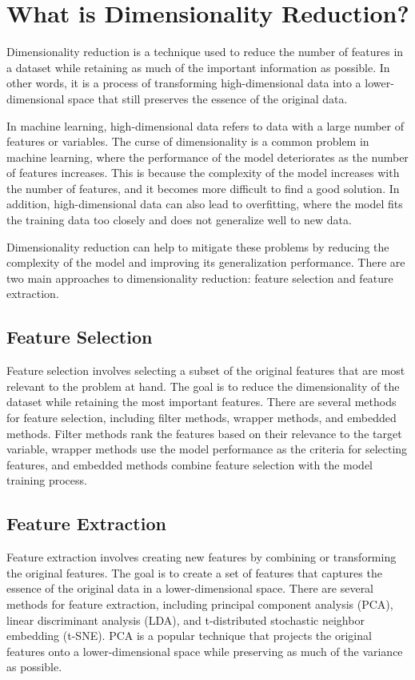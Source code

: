 \section{What is Dimensionality Reduction?}
    Dimensionality reduction is a technique used to reduce the number of features in a dataset while retaining as much of the important information as possible. In other words, it is a process of transforming high-dimensional data into a lower-dimensional space that still preserves the essence of the original data.

    In machine learning, high-dimensional data refers to data with a large number of features or variables. The curse of dimensionality is a common problem in machine learning, where the performance of the model deteriorates as the number of features increases. This is because the complexity of the model increases with the number of features, and it becomes more difficult to find a good solution. In addition, high-dimensional data can also lead to overfitting, where the model fits the training data too closely and does not generalize well to new data.

    Dimensionality reduction can help to mitigate these problems by reducing the complexity of the model and improving its generalization performance. There are two main approaches to dimensionality reduction: feature selection and feature extraction.

    \subsection{Feature Selection}
        Feature selection involves selecting a subset of the original features that are most relevant to the problem at hand. The goal is to reduce the dimensionality of the dataset while retaining the most important features. There are several methods for feature selection, including filter methods, wrapper methods, and embedded methods. Filter methods rank the features based on their relevance to the target variable, wrapper methods use the model performance as the criteria for selecting features, and embedded methods combine feature selection with the model training process.

    \subsection{Feature Extraction}
        Feature extraction involves creating new features by combining or transforming the original features. The goal is to create a set of features that captures the essence of the original data in a lower-dimensional space. There are several methods for feature extraction, including principal component analysis (PCA), linear discriminant analysis (LDA), and t{-}distributed stochastic neighbor embedding (t{-}SNE). PCA is a popular technique that projects the original features onto a lower-dimensional space while preserving as much of the variance as possible.

